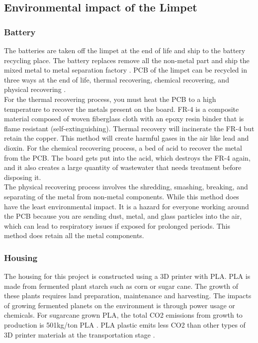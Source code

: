 \subsection*{Environmental impact of the Limpet}


\subsubsection*{Battery}
The batteries are taken off the limpet at the end of life and ship to the battery recycling place. The battery replaces remove all the non-metal part and ship the mixed metal to metal separation factory \cite{sus_bat_1}. PCB of the limpet can be recycled in three ways at the end of life, thermal recovering, chemical recovering, and physical recovering \cite{sus_bat_2}. \\

For the thermal recovering process, you must heat the PCB to a high temperature to recover the metals present on the board. FR-4 is a composite material composed of woven fiberglass cloth with an epoxy resin binder that is flame resistant (self-extinguishing). Thermal recovery will incinerate the FR-4 but retain the copper. This method will create harmful gases in the air like lead and dioxin. 
For the chemical recovering process, a bed of acid to recover the metal from the PCB. The board gets put into the acid, which destroys the FR-4 again, and it also creates a large quantity of wastewater that needs treatment before disposing it. \\

The physical recovering process involves the shredding, smashing, breaking, and separating of the metal from non-metal components. While this method does have the least environmental impact.
It is a hazard for everyone working around the PCB because you are sending dust, metal, and glass particles into the air, which can lead to respiratory issues if exposed for prolonged periods. This method does retain all the metal components.



\subsubsection*{Housing}
The housing for this project is constructed using a 3D printer with PLA. PLA is made from
fermented plant starch such as corn or sugar cane. The growth of these plants requires land
preparation, maintenance and harvesting. The impacts of growing fermented planets on the
environment is through power usage or chemicals. For sugarcane grown PLA, the total CO2
emissions from growth to production is 501kg/ton PLA \cite{sus_hou_1}. PLA plastic emits less CO2 than
other types of 3D printer materials at the transportation stage \cite{sus_hou_2}.

